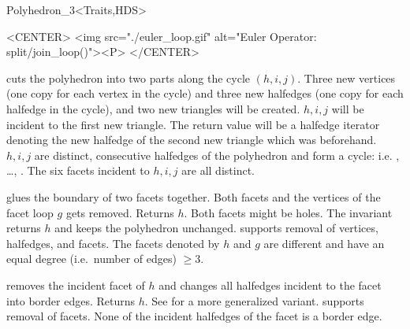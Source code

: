\begin{ccClassTemplate}{Polyhedron_3<Traits,HDS>}
\begin{ccHtmlOnly}
    <CENTER>
    <img src="./euler_loop.gif" alt="Euler Operator: split/join_loop()"><P>
    </CENTER>
\end{ccHtmlOnly}

   {cuts the polyhedron into two parts along the cycle $(h,i,j)$.
    Three new vertices (one copy for each vertex in the cycle) and
    three new halfedges (one copy for each halfedge in the cycle), and
    two new triangles will be 
    created. $h,i,j$ will be incident to the first new triangle.
    The return value will be a halfedge iterator denoting the
    new halfedge of the second new triangle which was 
    beforehand.
    \ccPrecond $h,i,j$ are distinct, consecutive halfedges of the
    polyhedron and form a cycle: i.e. , \ldots, . The six facets incident to $h,i,j$ are all
    distinct.
}

   {glues the boundary of two facets together.
    Both facets and the vertices of the facet loop $g$ gets removed. 
    Returns $h$.  Both facets might be holes.  
    The invariant  
    returns  $h$ and keeps the polyhedron unchanged.
    \ccPrecond {} supports removal of vertices, halfedges, and 
    facets. The facets denoted by $h$ and $g$ are different and have an
    equal degree (i.e.~number of edges) $\geq 3$.} 


    {removes the incident facet of $h$ and changes all halfedges incident 
    to the facet into border edges. Returns $h$. 
    See  for a more generalized variant.    
    \ccPrecond {} supports removal of facets. None of the 
    incident halfedges of the facet is a border edge.}



\end{ccClassTemplate}
